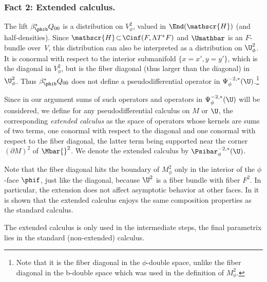 \subsubsection*{Fact 2: Extended calculus.}
The lift $\beta_{\phib}^* Q_{00}$ is a distribution on $V^2_\phi$, valued in $\End(\mathscr{H})$
(and half-densities). Since $\mathscr{H}\!\subset\!\Cinf(F,\Lambda T^*F)$ and $\Umathbar$ is an $F$-bundle over~$V$, this distribution can also be interpreted as a distribution on $\U^2_\phi$. It is conormal with respect to the interior submanifold $\{x=x', y=y'\}$, which is the diagonal in $V^2_\phi$, but is the fiber diagonal (thus larger than the diagonal) in $\U^2_\phi$. Thus $\beta_{\phib}^* Q_{00}$ does not define a pseudodifferential operator in $\Psi^{-2, *}_\phi(\U)$.\footnote{Note that it is the fiber diagonal in the $\phi$-double space, unlike the fiber diagonal in the b-double space which was used in the definition of $M^2_\phi$.}

Since in our argument sums of such operators and operators in $\Psi^{-2,*}_\phi(\U)$ will be considered, we
define for any pseudodifferential calculus on $M$ or $\U$, the corresponding \textit{extended calculus} as
the space of operators whose kernels are sums of two terms, one conormal with respect to the diagonal and one conormal with respect to the fiber diagonal, the latter term being supported near the corner $(\partial M)^2$ of $\Mbar{}^2$.
We denote the extended calculus by $\Psibar^{-2,*}_\phi(\U)$.

Note that the fiber diagonal hits the boundary of $M^2_\phi$ only in the interior of the $\phi$\nobreakdash-face $\phif$,
just like the diagonal, because $\U^2$ is a fiber bundle with fiber $F^2$. In particular, the extension
does not affect asymptotic behavior at other faces. In \cite[Prop.\,2]{grieser-para} it is shown that the
extended calculus enjoys the same composition properties as the standard calculus.

The extended calculus is only used in the intermediate steps, the final parametrix lies in the standard (non-extended) calculus.

